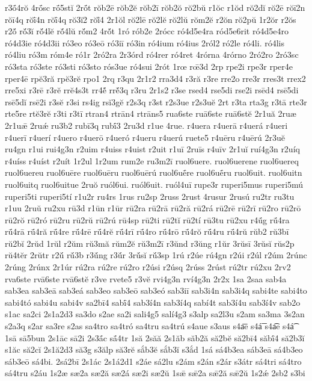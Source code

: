 {r3ṓ4rŏ
4rṓsc
rṓ5stĭ
2rṓt
rŏb2ē
rŏb2ĕ
rŏb2ī
rŏb2ŏ
rŏ2bŭ
r1ŏc
r1ŏd
rŏ2dĭ
rŏ2ē
rŏī2n
rŏī4q
rŏī́4n
rŏī́4q
rŏ3ĭ2
rŏĭ́4
2r1ŏl
rŏ2lē
rŏ2lĕ
rŏ2lŭ
rŏm2ĕ
r2ŏn
rŏ2pŭ
1r2ŏr
r2ŏs
r2ŏ́
rŏ́3ĭ
rŏ́4lĕ
rŏ́4lŭ
rŏ́m2
4rŏ́t
1ró
rób2e
2rócc
ró4d5e4ra
ród5e6rit
ró4d5e4ro
ró4d3ie
ró4d3ii
ró3eo
ró3eō
ró3iī
ró3in
ró4ium
ró4ius
2ról2
ró2le
ró4li.
ró4lis
ró4liu
ró3m
róm4e
ró1r
2ró2ra
2r3órd
ró4rer
ró4ret
4rórna
4rórno
2ró2ro
2ró3sc
ró3sta
ró3ste
ró3sti
ró3sto
rós3ue
ró4sui
2rót
1rœ
rœ̄3d
2rp
rpe2i
rpe3r
rper4e
rper4ē
rpĕ3ră
rpĕ3rĕ
rpo1
2rq
r3qu
2r1r2
rra3d4
r3ră
r3re
rre2o
rre3r
rres3t
rrex2
rre5xi
r3rē
r3rĕ
rrĕ4s3t
rr4ĕ́
rrĕ́3q
r3ru
2r1s2
r3se
rsed4
rse5di
rse2i
rsēd4
rsē5di
rsē5dĭ
rsē2i
r3sĕ
r3si
rs4ig
rsĭ3gĕ
r2s3q
r3st
r2s3ue
r2s3uĕ
2rt
r3ta
rta3g
r3tā
rte3r
rte5re
rtĕ3rĕ
r3ti
r3tī
rtran4
rtrān4
rtrāns5
rua6ste
ruā6ste
ruā6stĕ
2r1uă
2ruæ
2r1uǣ
2ruǽ
ru3b2
rubī3q
rubī́3
2ru3d
r1ue
4rue.
r4uera
r4uerā
r4uerá
r4ueri
r4uerī
r4uerí
r4uero
r4uerō
r4ueró
r4ueru
r4uerú
ruete5
r4uēru
r4uērú
2r3uĕ
ru4gn
r1ui
rui4g3n
r2uim
r4uiss
r4uist
r2uit
r1uī
2ruīs
r4uīv
2r1uĭ
ruí4g3n
r2uíq
r4uíss
r4uíst
r2uít
1r2ul
1r2um
rum2e
ru3m2ī
ruol6uere.
ruol6uerene
ruol6uereq
ruol6uereu
ruol6uēre
ruol6uēru
ruol6uērú
ruol6uḗre
ruol6uḗru
ruol6uit.
ruol6uitn
ruol6uitq
ruol6uitue
2ruŏ
ruól6ui.
ruól6uit.
ruól4uī
rupe3r
ruperi5mus
ruperi5mú
ruperi5ti
ruperi5tí
r1u2r
ru4rs
1rus
ru2sp
2russ
2rust
4rusur
2rusú
ru2tr
ru3tu
r1uu
2ruŭ
ru2xu
rū3d
r1ūn
r1ūr
rū2ra
rū2rā
rū2ră
rū2rá
rū2rē
rū2rī
rū2ro
rū2rō
rū2rŏ
rū2ró
rū2ru
rū2rŭ
rū2rú
rū4sp
rū2ti
rū2tĭ
rū2tí
rū3tu
rū2xu
r4ū́g
rū́4ra
rū́4rā
rū́4ră
rū́4re
rū́4rē
rū́4rĕ
rū́4rī
rū́4ro
rū́4rō
rū́4rŏ
rū́4ru
rū́4rŭ
rŭb2
rŭ3bī
rŭ2bĭ
2rŭd
1rŭl
r2ŭm
rŭ3mă
rŭm2ĕ
rŭ3m2ī
r3ŭnd
r3ŭng
r1ŭr
3rŭsī
3rŭsĭ
rŭs2p
rŭ4tĕr
2rŭtr
r2ŭ́
rŭ́3b
r3ŭ́ng
r3ŭ́r
3rŭ́sĭ
rŭ́3sp
1rú
r2úe
rú4gn
r2úi
r2úl
r2úm
2rúnc
2rúng
2rúnx
2r1úr
rú2ra
rú2re
rú2ro
r2úsi
r2úsq
2rúss
2rúst
rú2tr
rú2xu
2rv2
rva6ste
rvā6ste
rvā6stĕ
r3ve
rvete5
r3vĕ
rvi4g3n
rví4g3n
2r2x
1sa
2saa
sab4a
sab3ea
sab3eā
sab3eá
sab3eo
sab3eō
sab3eó
sab3iī
sab3i4n
sab3i4q
sabi4te
sabi4to
sabi4tó
sabi4u
sabi4v
sa2bī4
sabī́4
sab3í4n
sab3í4q
sabí4t
sab3í4u
sab3í4v
sab2o
s1ac
sa2ci
2s1a2d3
sa3do
s2ae
sa2i
sali4g5
salí4g3
s3alp
sa2l3u
s2am
sa3ma
3s2an
s2a3q
s2ar
sa3re
s2as
sa4tro
sa4tró
sa4tru
sa4trú
s4aue
s3aus
s4a͞e
s4á͞
s4a͡e
s4á͡
1sā
sā5bun
2s1āc
sā2i
2s3ā́c
sā́4tr
1să
2săă
2s1ăb
săb2ă
să2bĕ
să2bī4
săbī́4
să2b3ĭ
s1ăc
să2cĭ
2s1ă2d3
să3g
s3ălp
să3rĕ
sắb3ĕ
sắb3ĭ
s3ắd
1sá
sá4b3ea
sáb3eā
sá4b3eo
sáb3eō
sá4bi.
2sá2bī
2s1ác
2s1á2d1
s2áe
sá2lu
s2ám
s2án
s2ár
s3átr
sá4tri
sá4tro
sá4tru
s2áu
1s2æ
sæ2a
sæ2ă
sæ2á
sæ2i
sæ2ŭ
1sǣ
sǣ2a
sǣ2ă
sǣ2ŭ
1s2ǽ
2sb2
s3bi
}
